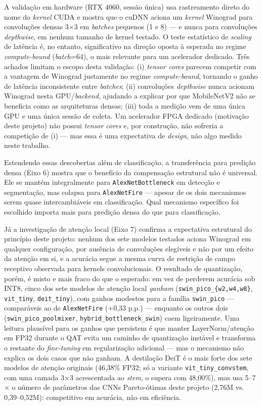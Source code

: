 \documentclass[conference]{IEEEtran}
\begin{document}
A validação em hardware (RTX 4060, sessão única) usa rastreamento direto do nome do
\textit{kernel} CUDA e mostra que o cuDNN aciona um \textit{kernel} Winograd para convoluções densas
3$\times$3 em \textit{batches} pequenos (1 e 8) — e nunca para convoluções \textit{depthwise}, em
nenhum tamanho de kernel testado. O teste estatístico de \textit{scaling} de latência é, no
entanto, significativo na direção oposta à esperada no regime \textit{compute-bound} (\textit{batch}=64), o mais relevante para
um acelerador dedicado. Três achados limitam o escopo desta validação: (i) \textit{tensor cores}
parecem competir com a vantagem de Winograd justamente no regime \textit{compute-bound}, tornando o
ganho de latência inconsistente entre \textit{batches}; (ii) convoluções \textit{depthwise} nunca
acionam Winograd nesta GPU/\textit{backend}, ajudando a explicar por que MobileNetV2 não se
beneficia como as arquiteturas densas; (iii) toda a medição vem de uma única GPU e uma única
sessão de coleta. Um acelerador FPGA dedicado (motivação deste projeto) não possui \textit{tensor
cores} e, por construção, não sofreria a competição de (i) — mas essa é uma expectativa de
\textit{design}, não algo medido neste trabalho.

Estendendo essas descobertas além de classificação, a transferência para predição densa
(Eixo 6) mostra que o benefício da compensação estrutural não é universal. Ele se mantém
integralmente para \texttt{AlexNetBottleneck} em detecção e segmentação, mas colapsa para
\texttt{AlexNetFire} — apesar de os dois mecanismos serem quase intercambiáveis em classificação.
Qual mecanismo específico foi escolhido importa mais para predição densa do que para classificação.

Já a investigação de atenção local (Eixo 7) confirma a expectativa estrutural do princípio deste
projeto: nenhum dos sete modelos testados aciona Winograd em qualquer configuração, por ausência
de convoluções elegíveis e não por um efeito da atenção em si, e a acurácia segue a mesma curva de
restrição de campo receptivo observada para kernels convolucionais. O resultado de quantização,
porém, é misto e mais fraco do que o esperado: em vez de perderem acurácia sob INT8, cinco dos
sete modelos de atenção local \emph{ganham} (\texttt{swin\_pico\_\{w2,w4,w8\}}, \texttt{vit\_tiny},
\texttt{deit\_tiny}), com ganhos modestos para a família \texttt{swin\_pico} — comparáveis ao de
\texttt{AlexNetFire} ($+$0,33 p.p.) — enquanto os outros dois (\texttt{swin\_pico\_poolmixer},
\texttt{hybrid\_bottleneck\_swin}) caem ligeiramente. Uma leitura plausível para os ganhos que
persistem é que manter LayerNorm/atenção em FP32 durante o QAT evita um caminho de quantização
instável e transforma o restante do \textit{fine-tuning} em regularização adicional — mas o
mecanismo não explica os dois casos que não ganham. A destilação DeiT é o mais forte dos sete modelos de
atenção originais (46,38\% FP32; só a variante \texttt{vit\_tiny\_convstem}, com uma camada
3$\times$3 acrescentada ao \textit{stem}, o supera com 48,00\%), mas usa 5--7$\times$ o número de parâmetros das CNNs
Pareto-ótimas deste projeto (2,76M vs. 0,39--0,52M): competitivo em acurácia, não em eficiência.
\end{document}
